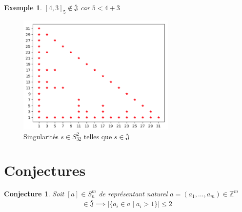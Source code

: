 \documentclass{article}
\newtheorem{conjecture}{Conjecture}
\newtheorem{example}{Exemple}
\begin{document}
\begin{example}
    ${[4, 3]}_5 \not \in \overline{\mathfrak{J}}$ car $5 < 4 + 3$
\end{example}

\begin{figure}[h]
    \caption{Singularités $s \in S_{32}^2$ telles que $s \in \overline{\mathfrak{J}}$}
    \centering
    \includegraphics[width=0.7\textwidth]{singularite_j_strict_m2_n32}
\end{figure}

\newpage

\section{Conjectures}

\begin{conjecture}
    Soit $[a] \in S_n^m$ de représentant naturel $a = (a_1, \dots, a_m) \in \mathbb{Z}^m$
    \begin{align*}
        [a] \in \overline{\mathfrak{J}} \implies |\{ a_i \in a \mid a_i > 1 \}| \leq 2
    \end{align*}
\end{conjecture}
\end{document}
